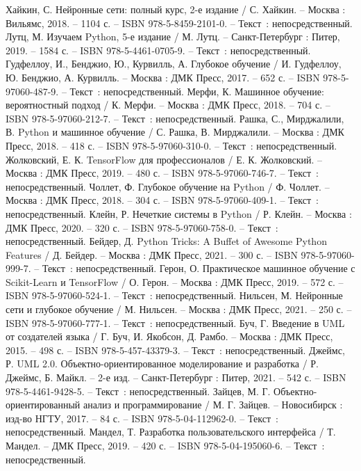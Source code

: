 
\begin{thebibliography}{15}

     Хайкин, С. Нейронные сети: полный курс, 2-е издание / С. Хайкин. – Москва : Вильямс, 2018. – 1104 с. – ISBN 978-5-8459-2101-0. – Текст~: непосредственный.
     Лутц, М. Изучаем Python, 5-е издание / М. Лутц. – Санкт-Петербург : Питер, 2019. – 1584 с. – ISBN 978-5-4461-0705-9. – Текст~: непосредственный.
     Гудфеллоу, И., Бенджио, Ю., Курвилль, А. Глубокое обучение / И. Гудфеллоу, Ю. Бенджио, А. Курвилль. – Москва : ДМК Пресс, 2017. – 652 с. – ISBN 978-5-97060-487-9. – Текст~: непосредственный.
     Мерфи, К. Машинное обучение: вероятностный подход / К. Мерфи. – Москва : ДМК Пресс, 2018. – 704 с. – ISBN 978-5-97060-212-7. – Текст~: непосредственный.
     Рашка, С., Мирджалили, В. Python и машинное обучение / С. Рашка, В. Мирджалили. – Москва : ДМК Пресс, 2018. – 418 с. – ISBN 978-5-97060-310-0. – Текст~: непосредственный.
     Жолковский, Е. К. TensorFlow для профессионалов / Е. К. Жолковский. – Москва : ДМК Пресс, 2019. – 480 с. – ISBN 978-5-97060-746-7. – Текст~: непосредственный.
     Чоллет, Ф. Глубокое обучение на Python / Ф. Чоллет. – Москва : ДМК Пресс, 2018. – 304 с. – ISBN 978-5-97060-409-1. – Текст~: непосредственный.
     Клейн, Р. Нечеткие системы в Python / Р. Клейн. – Москва : ДМК Пресс, 2020. – 320 с. – ISBN 978-5-97060-758-0. – Текст~: непосредственный.
     Бейдер, Д. Python Tricks: A Buffet of Awesome Python Features / Д. Бейдер. – Москва : ДМК Пресс, 2021. – 300 с. – ISBN 978-5-97060-999-7. – Текст~: непосредственный.
     Герон, О. Практическое машинное обучение с Scikit-Learn и TensorFlow / О. Герон. – Москва : ДМК Пресс, 2019. – 572 с. – ISBN 978-5-97060-524-1. – Текст~: непосредственный.
     Нильсен, М. Нейронные сети и глубокое обучение / М. Нильсен. – Москва : ДМК Пресс, 2021. – 250 с. – ISBN 978-5-97060-777-1. – Текст~: непосредственный.
     Буч, Г. Введение в UML от создателей языка / Г. Буч, И. Якобсон, Д. Рамбо. – Москва : ДМК Пресс, 2015. – 498 с. – ISBN 978-5-457-43379-3. – Текст~: непосредственный.
     Джеймс, Р. UML 2.0. Объектно-ориентированное моделирование и разработка / Р. Джеймс, Б. Майкл. – 2-е изд. – Санкт-Петербург : Питер, 2021. – 542 с. – ISBN 978-5-4461-9428-5. – Текст~: непосредственный.
     Зайцев, М. Г. Объектно-ориентированный анализ и программирование / М. Г. Зайцев. – Новосибирск : изд-во НГТУ, 2017. – 84 с. – ISBN 978-5-04-112962-0. – Текст~: непосредственный.
     Мандел, Т. Разработка пользовательского интерфейса / Т. Мандел. – ДМК Пресс, 2019. – 420 с. – ISBN 978-5-04-195060-6. – Текст~: непосредственный.
\end{thebibliography}
